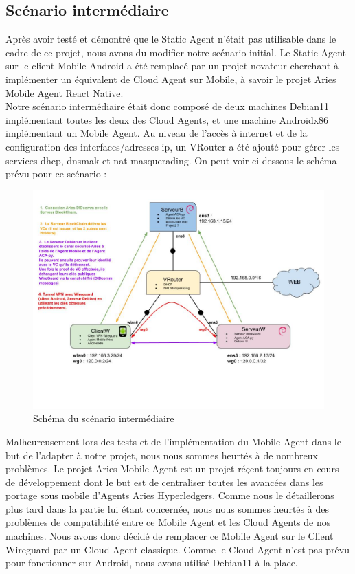 \documentclass[12pt, openany]{report}
\begin{document}
\subsection{Scénario intermédiaire}
\noindent
\begin{flushleft}
Après avoir testé et démontré que le Static Agent n'était pas utilisable dans le cadre de ce projet, nous avons du modifier notre scénario initial. Le Static Agent sur le client Mobile Android a été remplacé par un projet novateur cherchant à implémenter un équivalent de Cloud Agent sur Mobile, à savoir le projet Aries Mobile Agent React Native.\\
Notre scénario intermédiaire était donc composé de deux machines Debian11 implémentant toutes les deux des Cloud Agents, et une machine Androidx86 implémentant un Mobile Agent. Au niveau de l'accès à internet et de la configuration des interfaces/adresses ip, un VRouter a été ajouté pour gérer les services dhcp, dnsmak et nat masquerading. On peut voir ci-dessous le schéma prévu pour ce scénario :\\
\begin{figure}[H]
\includegraphics[width=\textwidth]{scenario2.jpg}
\centering
\caption{Schéma du scénario intermédiaire}
\end{figure}
Malheureusement lors des tests et de l'implémentation du Mobile Agent dans le but de l'adapter à notre projet, nous nous sommes heurtés à de nombreux problèmes. Le projet Aries Mobile Agent est un projet réçent toujours en cours de développement dont le but est de centraliser toutes les avancées dans les portage sous mobile d'Agents Aries Hyperledgers. Comme nous le détaillerons plus tard dans la partie lui étant concernée, nous nous sommes heurtés à des problèmes de compatibilité entre ce Mobile Agent et les Cloud Agents de nos machines. Nous avons donc décidé de remplacer ce Mobile Agent sur le Client Wireguard par un Cloud Agent classique. Comme le Cloud Agent n'est pas prévu pour fonctionner sur Android, nous avons utilisé Debian11 à la place. \\

\end{flushleft}
\end{document}
